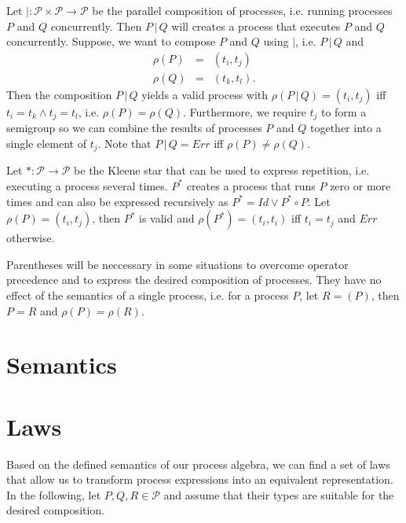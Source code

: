 Let $| \colon \mathcal{P} \times \mathcal{P} \to \mathcal{P}$ be the parallel composition of processes, i.e. running processes $P$ and $Q$ concurrently. Then $P \,|\, Q$ will creates a process that executes $P$ and $Q$ concurrently. Suppose, we want to compose $P$ and $Q$ using $|$, i.e. $P \,|\, Q$ and
\begin{eqnarray*}
  \rho \left( P \right) & = & \left( t_i, t_j \right) \\
  \rho \left( Q \right) & = & \left( t_k, t_l \right).
\end{eqnarray*}
Then the composition $P \,|\, Q$ yields a valid process with $\rho \left( P \,|\, Q \right) = \left( t_i, t_j \right)$ iff $t_i = t_k \wedge t_j = t_l$, i.e. $\rho \left( P \right) = \rho \left( Q \right)$. Furthermore, we require $t_j$ to form a semigroup so we can combine the results of processes $P$ and $Q$ together into a single element of $t_j$. Note that $P \,|\, Q = Err$ iff $\rho \left( P \right) \neq \rho \left( Q \right)$.

Let $* \colon \mathcal{P} \to \mathcal{P}$ be the Kleene star that can be used to express repetition, i.e. executing a process several times. $P^*$ creates a process that runs $P$ zero or more times and can also be expressed recursively as $P^* = Id \vee P^* \circ P$. Let $\rho \left( P \right) = \left( t_i, t_j \right)$, then $P^*$ is valid and $\rho \left( P^* \right) = \left( t_i, t_i \right)$ iff $t_i = t_j$ and $Err$ otherwise.

Parentheses will be neccessary in some situations to overcome operator precedence and to express the desired composition of processes. They have no effect of the semantics of a single process, i.e. for a process $P$, let $R = \left( P \right)$, then $P = R$ and $\rho \left( P \right) = \rho \left( R \right)$.

\section{Semantics}

\section{Laws}
\label{chp:laws}
Based on the defined semantics of our process algebra, we can find a set of laws that allow us to transform process expressions into an equivalent representation. In the following, let $P, Q, R \in \mathcal{P}$ and assume that their types are suitable for the desired composition.

